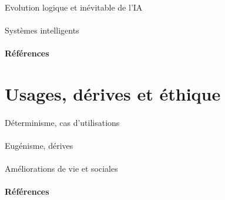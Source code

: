 \paragraph{} Evolution logique et inévitable de l'IA 
\paragraph{} Systèmes intelligents
\paragraph{Références} \cite{AlphaGo:0} \cite{AlphaGo:1}

\section{Usages, dérives et éthique}
\paragraph{} Déterminisme, cas d'utilisations
\paragraph{} Eugénisme, dérives
\paragraph{} Améliorations de vie et sociales
\paragraph{Références} \cite{Asimov:0} \cite{Damasio:0}